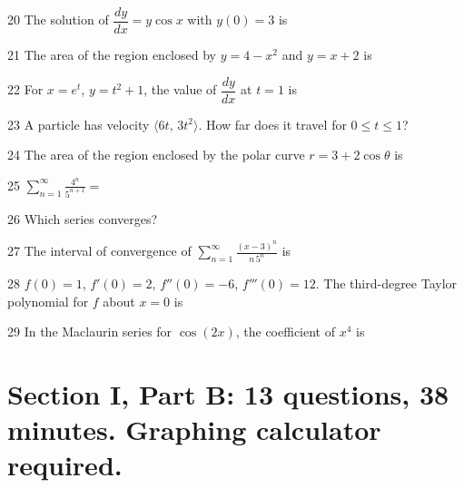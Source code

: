 \documentclass{apcalc}
\begin{document}
\begin{q}{20}
The solution of $\dfrac{dy}{dx}=y\cos x$ with $y(0)=3$ is
\end{q}
\begin{q}{21}
The area of the region enclosed by $y=4-x^2$ and $y=x+2$ is
\end{q}
\begin{q}{22}
For $x=e^t$, $y=t^2+1$, the value of $\dfrac{dy}{dx}$ at $t=1$ is
\end{q}
\begin{q}{23}
A particle has velocity $\langle6t,\,3t^2\rangle$. How far does it travel for $0\le t\le1$?
\end{q}
\begin{q}{24}
The area of the region enclosed by the polar curve $r=3+2\cos\theta$ is
\end{q}
\begin{q}{25}
$\displaystyle\sum_{n=1}^{\infty}\frac{4^n}{5^{n+1}}=$
\end{q}
\begin{q}{26}
Which series converges?
\end{q}
\begin{q}{27}
The interval of convergence of $\displaystyle\sum_{n=1}^\infty\frac{(x-3)^n}{n\,5^n}$ is
\chfour{$(-2,8)$}{$(-2,8]$}{$[-2,8)$}{$[-2,8]$}
\end{q}
\begin{q}{28}
$f(0)=1$, $f'(0)=2$, $f''(0)=-6$, $f'''(0)=12$. The third-degree Taylor polynomial for $f$ about $x=0$ is
\end{q}
\begin{q}{29}
In the Maclaurin series for $\cos(2x)$, the coefficient of $x^4$ is
\end{q}
\clearpage\section*{Section I, Part B: 13 questions, 38 minutes. Graphing calculator required.}
\end{document}
